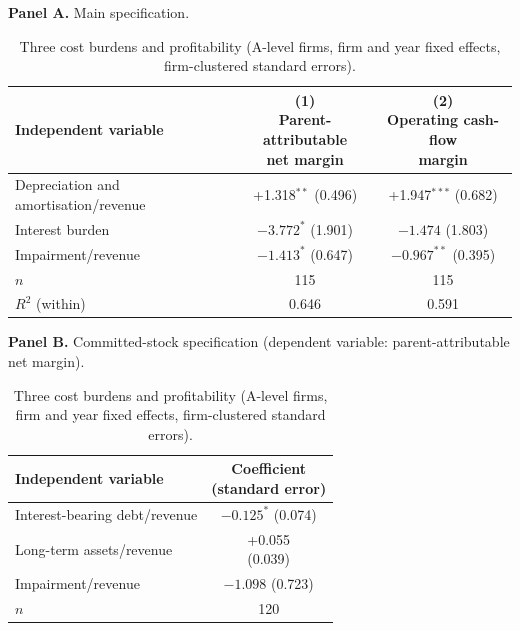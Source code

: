 \documentclass[review,3p,times]{elsarticle}
\begin{document}
\begin{table}[!htbp]
\centering
\caption{Three cost burdens and profitability (A-level firms, firm and year fixed effects, firm-clustered standard errors).}\label{tab:5}
\begin{minipage}{\textwidth}
\centering
\footnotesize
\textbf{Panel A.} Main specification.
\par\smallskip
\begin{tabular}{@{}lcc@{}}
\toprule
Independent variable & \shortstack{(1)\\Parent-attributable\\net margin} & \shortstack{(2)\\Operating cash-flow\\margin} \\
\midrule
Depreciation and amortisation/revenue & \shortstack{+1.318$^{**}$\\ (0.496)} & \shortstack{+1.947$^{***}$\\ (0.682)} \\
Interest burden & \shortstack{$-3.772^{*}$\\ (1.901)} & \shortstack{$-1.474$\\ (1.803)} \\
Impairment/revenue & \shortstack{$-1.413^{*}$\\ (0.647)} & \shortstack{$-0.967^{**}$\\ (0.395)} \\
$n$ & 115 & 115 \\
$R^{2}$ (within) & 0.646 & 0.591 \\
\bottomrule
\end{tabular}
\par\medskip
\textbf{Panel B.} Committed-stock specification (dependent variable: parent-attributable net margin).
\par\smallskip
\begin{tabular}{@{}lc@{}}
\toprule
Independent variable & \shortstack{Coefficient\\(standard error)} \\
\midrule
Interest-bearing debt/revenue & \shortstack{$-0.125^{*}$\\ (0.074)} \\
Long-term assets/revenue & \shortstack{+0.055\\ (0.039)} \\
Impairment/revenue & \shortstack{$-1.098$\\ (0.723)} \\
$n$ & 120 \\

\end{tabular}
\end{minipage}
\end{table}
\end{document}
